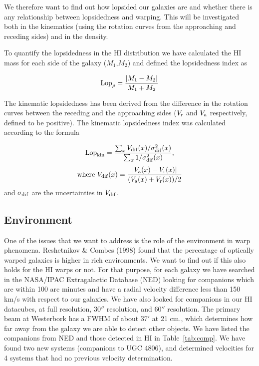\documentclass{aa}
\newcommand{\rmn}[1] {{\rm #1}}
\begin{document}
We therefore want to find out how lopsided our galaxies are and whether
there is any relationship between lopsidedness and warping. This will
be investigated both in the kinematics (using the rotation curves from the
approaching and receding sides) and in the density. 

To quantify the lopsidedness in the HI distribution we have calculated
the HI mass for each side of the galaxy ($M_1$,$M_2$) and defined the 
lopsidedness index as 

\begin{equation}
{\mbox{Lop}}_{\rho}= {|M_1-M_2|\over{M_1+M_2}}
\end{equation}

The kinematic lopsidedness has been derived from the difference in the
rotation curves between the receding and the approaching sides ($V_{\rm r}$
and $V_{\rm a}$ respectively, defined to be positive). The kinematic
lopsidedness index was calculated according to the formula 

\begin{equation}
{\rmn {Lop}}_{\rm kin}={\sum_x V_{\rm dif}(x)/{\sigma^2_{\rm dif}(x)} \over{\sum_x
    1/{\sigma^2_{\rm dif}(x)}}},  
\end{equation}
\begin{equation}
\mbox{where   } V_{\rm dif}(x)={|V_{\rm a}(x)-V_{\rm r}(x)| \over (V_{\rm a}(x)+V_{\rm r}(x))/2}
\end{equation}
and $\sigma_{\rm dif}$ are the uncertainties in $V_{\rm dif}$. 

\subsection{Environment}
\label{environment}

One of the issues that we want to address is the role of the
environment in warp phenomena. Reshetnikov \& Combes (1998) found that
the percentage of optically warped galaxies is higher in 
rich environments. We want
to find out if this also holds for the HI warps or not. For that
purpose, for each galaxy we have searched in the NASA/IPAC
Extragalactic Database (NED) looking for companions which are within 100 arc
minutes and have a radial 
velocity difference less than 150 km/s with respect 
to our galaxies. We have also looked for companions in our HI datacubes, at full
resolution, 30$''$ resolution, and 60$''$ resolution. The
primary beam at Westerbork has a FWHM of about 37$'$ at 21 cm., which
determines how far away from the galaxy 
we are able to detect other objects. We have listed the companions
from NED and those detected in HI in Table~\ref{tab:comp}. We have found two
new systems (companions to UGC 4806), and determined velocities for 4
systems that had no previous velocity determination. 
\end{document}
